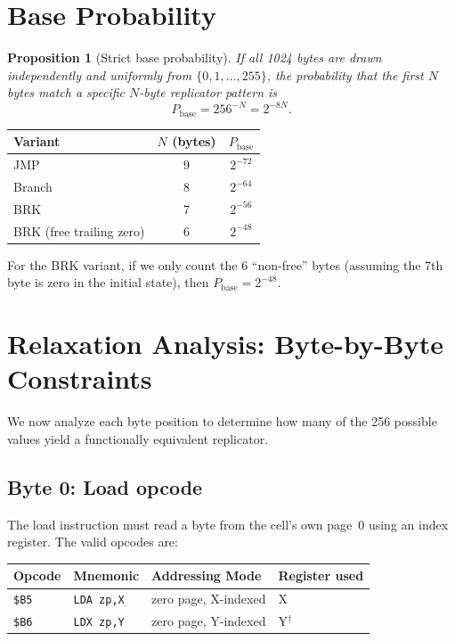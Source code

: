 \documentclass{article}
\newcommand{\hex}[1]{\texttt{\$#1}}
\newcommand{\opcode}[1]{\texttt{#1}}
\newcommand{\Pbase}{P_{\mathrm{base}}}
\newtheorem{proposition}{Proposition}
\begin{document}
\section{Base Probability}
\label{sec:base}

\begin{proposition}[Strict base probability]
If all 1024 bytes are drawn independently and uniformly from
$\{0, 1, \ldots, 255\}$, the probability that the first $N$ bytes
match a specific $N$-byte replicator pattern is
\[
   \Pbase = 256^{-N} = 2^{-8N}.
\]
\end{proposition}

\begin{center}
\begin{tabular}{lcc}
\toprule
Variant & $N$ (bytes) & $\Pbase$ \\
\midrule
JMP  & 9 & $2^{-72}$ \\
Branch & 8 & $2^{-64}$ \\
BRK  & 7 & $2^{-56}$ \\
BRK (free trailing zero) & 6 & $2^{-48}$ \\
\bottomrule
\end{tabular}
\end{center}

For the BRK variant, if we only count the 6 ``non-free'' bytes
(assuming the 7th byte is zero in the initial state), then
$\Pbase = 2^{-48}$.

\section{Relaxation Analysis: Byte-by-Byte Constraints}
\label{sec:relaxation}

We now analyze each byte position to determine how many of the 256
possible values yield a functionally equivalent replicator.

\subsection{Byte 0: Load opcode}

The load instruction must read a byte from the cell's own page~0 using
an index register. The valid opcodes are:

\begin{center}
\begin{tabular}{llll}
\toprule
Opcode & Mnemonic & Addressing Mode & Register used \\
\midrule
\hex{B5} & \opcode{LDA zp,X} & zero page, X-indexed & X \\
\hex{B6} & \opcode{LDX zp,Y} & zero page, Y-indexed & Y$^\dagger$ \\
\bottomrule
\end{tabular}
\end{center}
\end{document}
